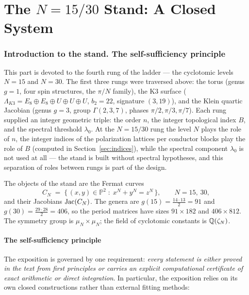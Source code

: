 \part{The $N=15/30$ Stand: A Closed System}

\section{Introduction to the stand. The self-sufficiency principle}
\label{sec:cyclo-intro}

This part is devoted to the fourth rung of the ladder --- the
cyclotomic levels $N=15$ and $N=30$. The first three rungs were
traversed above: the torus (genus $g=1$, four spin structures, the
$\pi/N$ family), the K3 surface
($\Lambda_{K3}=E_8\oplus E_8\oplus U\oplus U\oplus U$, $b_2=22$,
signature $(3,19)$), and the Klein quartic Jacobian (genus $g=3$,
group $\Gamma(2,3,7)$, phases $\pi/2,\pi/3,\pi/7$). Each rung
supplied an integer geometric triple: the order $n$, the integer
topological index $B$, and the spectral threshold $\lambda_0$. At
the $N=15/30$ rung the level $N$ plays the role of $n$, the integer
indices of the polarization lattices per conductor blocks play the
role of $B$ (computed in Section~\ref{sec:indices}), while the
spectral component $\lambda_0$ is not used at all --- the stand is
built without spectral hypotheses, and this separation of roles
between rungs is part of the design.

The objects of the stand are the Fermat curves
\begin{equation}\label{eq:fermat}
  C_N \;=\; \{\, (x,y)\in \mathbb{P}^2 \;:\; x^N + y^N = z^N \,\},
  \qquad N = 15,\ 30,
\end{equation}
and their Jacobians $\operatorname{Jac}(C_N)$. The genera are
$g(15)=\tfrac{14\cdot 13}{2}=91$ and $g(30)=\tfrac{29\cdot 28}{2}
=406$, so the period matrices have sizes $91\times182$ and
$406\times812$. The symmetry group is $\mu_N\times\mu_N$; the field
of cyclotomic constants is $\mathbb{Q}(\zeta_N)$.

\subsection{The self-sufficiency principle}

The exposition is governed by one requirement: \emph{every statement
is either proved in the text from first principles or carries an
explicit computational certificate of exact arithmetic or direct
integration}. In particular, the exposition relies on its own closed
constructions rather than external fitting methods:

